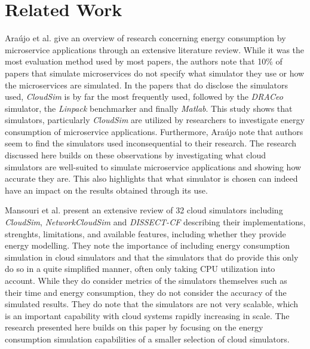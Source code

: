 \section{Related Work}\label{s:related}
Araújo et al. \cite{araujo_energy_2024} give an overview of research concerning energy consumption by microservice applications through an extensive literature review. While it was the most evaluation method used by most papers, the authors note that 10\% of papers that simulate microservices do not specify what simulator they use or how the microservices are simulated. In the papers that do disclose the simulators used, \textit{CloudSim} is by far the most frequently used, followed by the \textit{DRACeo} simulator, the \textit{Linpack} benchmarker and finally \textit{Matlab}. This study shows that simulators, particularly \textit{CloudSim} are utilized by researchers to investigate energy consumption of microservice applications. Furthermore, Araújo \etal note that authors seem to find the simulators used inconsequential to their research. The research discussed here builds on these observations by investigating what cloud simulators are well-suited to simulate microservice applications and showing how accurate they are. This also highlights that what simulator is chosen can indeed have an impact on the results obtained through its use.

Mansouri et al. \cite{mansouri_cloud_2020} present an extensive review of 32 cloud simulators including \textit{CloudSim}, \textit{NetworkCloudSim} and \textit{DISSECT-CF} describing their implementations, strenghts, limitations, and available features, including whether they provide energy modelling. They note the importance of including energy consumption simulation in cloud simulators and that the simulators that do provide this only do so in a quite simplified manner, often only taking CPU utilization into account. While they do consider metrics of the simulators themselves such as their time and energy consumption, they do not consider the accuracy of the simulated results. They do note that the simulators are not very scalable, which is an important capability with cloud systems rapidly increasing in scale. The research presented here builds on this paper by focusing on the energy consumption simulation capabilities of a smaller selection of cloud simulators.

